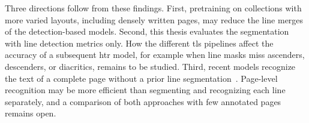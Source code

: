 Three directions follow from these findings. First, pretraining on collections with more varied layouts, including densely written pages, may reduce the line merges of the detection-based models. Second, this thesis evaluates the segmentation with line detection metrics only. How the different \gls{tls} pipelines affect the accuracy of a subsequent \gls{htr} model, for example when line masks miss ascenders, descenders, or diacritics, remains to be studied. Third, recent models recognize the text of a complete page without a prior line segmentation~\cite{coquenet2023dan}. Page-level recognition may be more efficient than segmenting and recognizing each line separately, and a comparison of both approaches with few annotated pages remains open.
